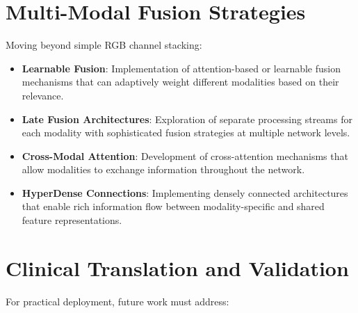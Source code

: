 \section{Multi-Modal Fusion Strategies}

Moving beyond simple RGB channel stacking:

\begin{itemize}
    \item \textbf{Learnable Fusion}: Implementation of attention-based or learnable fusion mechanisms that can adaptively weight different modalities based on their relevance.
    
    \item \textbf{Late Fusion Architectures}: Exploration of separate processing streams for each modality with sophisticated fusion strategies at multiple network levels.
    
    \item \textbf{Cross-Modal Attention}: Development of cross-attention mechanisms that allow modalities to exchange information throughout the network.
    
    \item \textbf{HyperDense Connections}: Implementing densely connected architectures that enable rich information flow between modality-specific and shared feature representations.
\end{itemize}

\section{Clinical Translation and Validation}

For practical deployment, future work must address:

